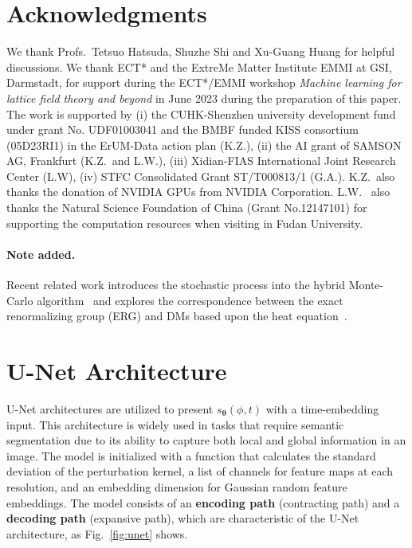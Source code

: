 \section*{Acknowledgments}

We thank Profs.\ Tetsuo Hatsuda, Shuzhe Shi and Xu-Guang Huang for helpful discussions. 
We thank ECT* and the ExtreMe Matter Institute EMMI at GSI, Darmstadt, for support during the ECT*/EMMI workshop {\em Machine learning for lattice field theory and beyond} in June 2023 during the preparation of this paper.
The work is supported by (i) the CUHK-Shenzhen university development fund under grant No. UDF01003041 and the BMBF funded KISS consortium (05D23RI1) in the ErUM-Data action plan (K.Z.), (ii) the AI grant of SAMSON AG, Frankfurt (K.Z.\ and L.W.), (iii) Xidian-FIAS International Joint Research Center (L.W), (iv) STFC Consolidated Grant ST/T000813/1 (G.A.). K.Z.\ also thanks the donation of NVIDIA GPUs from NVIDIA Corporation. L.W. \ also thanks the Natural Science Foundation of China  (Grant No.12147101) for supporting the computation resources when visiting in Fudan University.

\paragraph{Note added.} Recent related work introduces the stochastic process into the hybrid Monte-Carlo algorithm~\cite{Robnik:2023pgt} and explores the correspondence between the exact renormalizing group (ERG) and DMs based upon the heat equation~\cite{Cotler:2023lem}.

\appendix


\section{U-Net Architecture}\label{app:unet}

U-Net architectures are utilized to present $s_\mathbf{\theta}(\phi,t)$ with a time-embedding input. This architecture is widely used in tasks that require semantic segmentation due to its ability to capture both local and global information in an image. The model is initialized with a function that calculates the standard deviation of the perturbation kernel, a list of channels for feature maps at each resolution, and an embedding dimension for Gaussian random feature embeddings. The model consists of an \textbf{encoding path} (contracting path) and a \textbf{decoding path} (expansive path), which are characteristic of the U-Net architecture, as Fig.~\ref{fig:unet} shows. 

